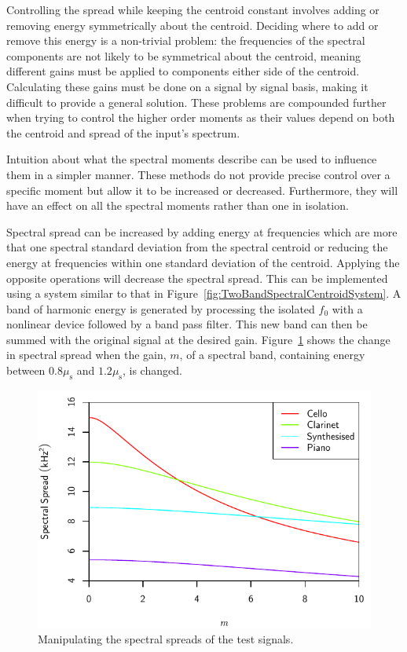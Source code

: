 			Controlling the spread while keeping the centroid constant involves adding or removing energy
			symmetrically about the centroid. Deciding where to add or remove this energy is a non-trivial
			problem: the frequencies of the spectral components are not likely to be symmetrical about the
			centroid, meaning different gains must be applied to components either side of the centroid.
			Calculating these gains must be done on a signal by signal basis, making it difficult to provide a
			general solution. These problems are compounded further when trying to control the higher order
			moments as their values depend on both the centroid and spread of the input's spectrum.

			Intuition about what the spectral moments describe can be used to influence them in a simpler
			manner. These methods do not provide precise control over a specific moment but allow it to be
			increased or decreased.  Furthermore, they will have an effect on all the spectral moments rather
			than one in isolation. 
			
			Spectral spread can be increased by adding energy at frequencies which are more that one spectral
			standard deviation from the spectral centroid or reducing the energy at frequencies within one
			standard deviation of the centroid. Applying the opposite operations will decrease the spectral
			spread. This can be implemented using a system similar to that in
			Figure~\ref{fig:TwoBandSpectralCentroidSystem}. A band of harmonic energy is generated by
			processing the isolated $f_{0}$ with a nonlinear device followed by a band pass filter. This new
			band can then be summed with the original signal at the desired gain. Figure~\ref{fig:MoveSpreads}
			shows the change in spectral spread when the gain, $m$, of a spectral band, containing energy
			between $0.8\mu_{\mathrm{s}}$ and $1.2\mu_{\mathrm{s}}$, is changed.

			\begin{figure}[h!]
				\centering
				\includegraphics{chapter6/Images/MoveSpreads.pdf}
				\caption{Manipulating the spectral spreads of the test signals.}
				\label{fig:MoveSpreads}
			\end{figure}

